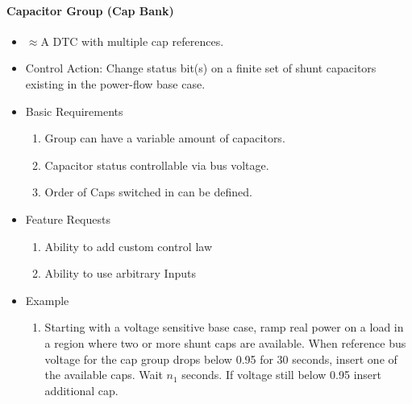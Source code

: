 \documentclass[12pt]{article}
\begin{document}
\pagebreak
\begin{multicols*}{2}
\raggedright
\paragraph{Capacitor Group (Cap Bank)}
\begin{itemize}
	\item $\approx$A DTC with multiple cap references.
	\item Control Action: Change status bit(s) on a finite set of shunt capacitors existing in the power-flow base case. 
	\item Basic Requirements
	\begin{enumerate}
		\item Group can have a variable amount of capacitors.
		\item Capacitor status controllable via bus voltage.
		\item Order of Caps switched in can be defined.
	\end{enumerate}
	\item Feature Requests
	\begin{enumerate}
		\item Ability to add custom control law
		\item Ability to use arbitrary Inputs
	\end{enumerate}
	\item Example
	\begin{enumerate}
	\item Starting with a voltage sensitive base case, ramp real power on a load in a region where two or more shunt caps are available. When reference bus voltage for the cap group drops below 0.95 for 30 seconds, insert one of the available caps. Wait $n_1$ seconds. If voltage still below 0.95 insert additional cap.
	\end{enumerate}	
\end{itemize}

\vfill\null
\columnbreak


\end{multicols*}
\end{document}
